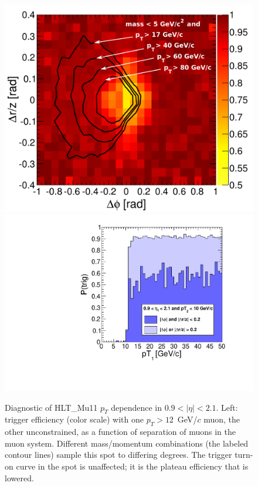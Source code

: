\documentclass[12pt]{cms-tdr}
\begin{document}
\begin{figure}[p]
\includegraphics[width=0.48\linewidth]{PLOTS/endcap_dphidr_HLTMu11_09_21.pdf} \hfill
\includegraphics[width=0.48\linewidth]{PLOTS/trigger_turnonMu11.pdf}

\caption{Diagnostic of HLT\_Mu11 $p_T$ dependence in $0.9 < |\eta| <
  2.1$.  Left: trigger efficiency (color scale) with one $p_T >
  12$~GeV/$c$ muon, the other unconstrained, as a function of
  separation of muons in the muon system.  Different mass/momentum
  combinations (the labeled contour lines) sample this spot to
  differing degrees.  The trigger turn-on curve in the spot is
  unaffected; it is the plateau efficiency that is
  lowered. \label{fig:triggersimulation2}}
\end{figure}

\end{document}

